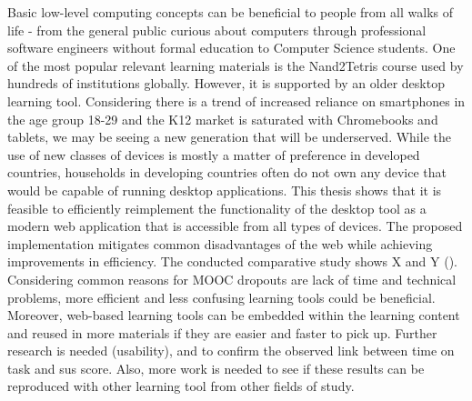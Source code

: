 Basic low-level computing concepts can be beneficial to people from all walks of life - from the general public curious about computers through professional software engineers without formal education to Computer Science students.
One of the most popular relevant learning materials is the Nand2Tetris course used by hundreds of institutions globally.
However, it is supported by an older desktop learning tool.
Considering there is a trend of increased reliance on smartphones in the age group 18-29 and the K12 market is saturated with Chromebooks and tablets, we may be seeing a new generation that will be underserved.
While the use of new classes of devices is mostly a matter of preference in developed countries, households in developing countries often do not own any device that would be capable of running desktop applications.
This thesis shows that it is feasible to efficiently reimplement the functionality of the desktop tool as a modern web application that is accessible from all types of devices.
The proposed implementation mitigates common disadvantages of the web while achieving improvements in efficiency.
The conducted comparative study shows X and Y ().
Considering common reasons for MOOC dropouts are lack of time and technical problems, more efficient and less confusing learning tools could be beneficial.
Moreover, web-based learning tools can be embedded within the learning content and reused in more materials if they are easier and faster to pick up.
Further research is needed (usability), and to confirm the observed link between time on task and sus score.
Also, more work is needed to see if these results can be reproduced with other learning tool from other fields of study.

\cleardoublepage
\rhead{\nouppercase{\rightmark}}

\setcounter{page}{1}
